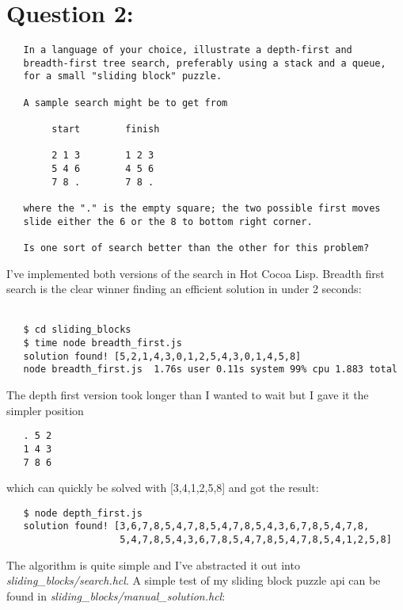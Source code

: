 \documentclass[11pt]{article}
\begin{document}
\section*{Question 2:}
\label{sec-2}

  
\begin{verbatim}
   In a language of your choice, illustrate a depth-first and
   breadth-first tree search, preferably using a stack and a queue, 
   for a small "sliding block" puzzle.
   
   A sample search might be to get from 
   
        start        finish      
          
        2 1 3        1 2 3
        5 4 6        4 5 6
        7 8 .        7 8 .
   
   where the "." is the empty square; the two possible first moves 
   slide either the 6 or the 8 to bottom right corner.
   
   Is one sort of search better than the other for this problem?
\end{verbatim}

  
  \noindent
  I've implemented both versions of the search in Hot Cocoa Lisp.
  Breadth first search is the clear winner finding an efficient
  solution in under 2 seconds:\\ \\
  
\begin{verbatim}
   $ cd sliding_blocks
   $ time node breadth_first.js
   solution found! [5,2,1,4,3,0,1,2,5,4,3,0,1,4,5,8]
   node breadth_first.js  1.76s user 0.11s system 99% cpu 1.883 total
\end{verbatim}

  
  \noindent
  The depth first version took longer than I wanted to wait but I gave
  it the simpler position
  
\begin{verbatim}
   . 5 2
   1 4 3
   7 8 6
\end{verbatim}

  
  \noindent
  which can quickly be solved with [3,4,1,2,5,8] and got the result:
  
\begin{verbatim}
   $ node depth_first.js
   solution found! [3,6,7,8,5,4,7,8,5,4,7,8,5,4,3,6,7,8,5,4,7,8,
                    5,4,7,8,5,4,3,6,7,8,5,4,7,8,5,4,7,8,5,4,1,2,5,8]
\end{verbatim}

  
  \noindent
  The algorithm is quite simple and I've abstracted it out into
  \emph{sliding\_blocks/search.hcl}. A simple test of my sliding block
  puzzle api can be found in \emph{sliding\_blocks/manual\_solution.hcl}:
  
\end{document}
